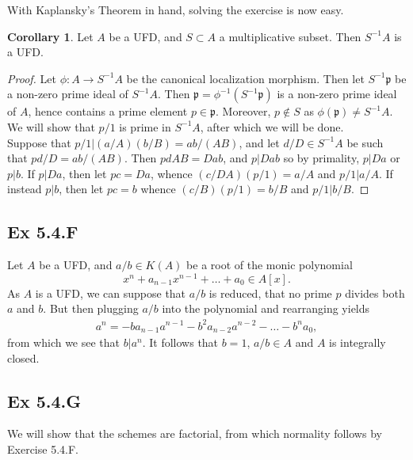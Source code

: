 \documentclass{article}
\theoremstyle{definition}
\newtheorem{corollary}[theorem]{Corollary}
\begin{document}
With Kaplansky's Theorem in hand, solving the exercise is now easy.

\begin{corollary}
	Let $A$ be a UFD, and $S \subset A$ a multiplicative subset.
	Then $S^{-1}A$ is a UFD.
\end{corollary}
\begin{proof}

	Let $\phi : A \to S^{-1}A$ be the canonical localization morphism. Then let
	$S^{-1}\mathfrak{p}$ be a non-zero prime ideal of $S^{-1}A$. Then
	$\mathfrak{p} = \phi^{-1}(S^{-1}\mathfrak{p})$ is a non-zero prime ideal of
	$A$, hence contains a prime element $p \in \mathfrak{p}$. Moreover, $p \not
		\in S$ as $\phi(\mathfrak{p}) \not = S^{-1}A$. We will show that $p/1$ is
	prime in $S^{-1}A$, after which we will be done. \\

	Suppose that $p/1 | (a/A) (b/B) = ab/(AB)$, and let $d/D \in S^{-1}A$ be
	such that $pd/D = ab/(AB)$. Then $pdAB = Dab$, and $p | Dab$ so by
	primality, $p | Da$ or $p | b$. If $p | Da$, then let $pc = Da$, whence
	$(c/DA)(p/1) = a/A$ and $p/1 | a/A$. If instead $p | b$, then let $pc = b$
	whence $(c/B)(p/1) = b/B$ and $p/1 | b/B$.

\end{proof}

\subsection*{Ex 5.4.F}

Let $A$ be a UFD, and $a/b \in K(A)$ be a root of the monic polynomial
\[
	x^n + a_{n - 1}x^{n-1} + \ldots + a_0 \in A[x].
\]
As $A$ is a UFD, we can suppose that $a/b$ is reduced, that no prime $p$
divides both $a$ and $b$. But then plugging $a/b$ into the polynomial and
rearranging yields
\begin{align*}
	a^n
	=
	-
	b a_{n - 1} a^{n - 1}
	-
	b^2 a_{n - 2} a^{n - 2}
	-
	\ldots
	-
	b^{n}a_0,
\end{align*}
from which we see that $b | a^n$. It follows that $b = 1$, $a/b \in A$ and $A$
is integrally closed.

\subsection*{Ex 5.4.G}

We will show that the schemes are factorial, from which normality follows by
Exercise 5.4.F. \\
\end{document}
